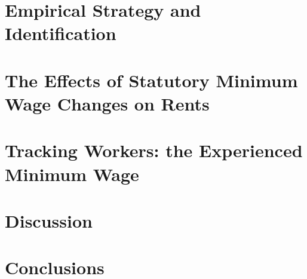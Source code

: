 \documentclass{article}
\begin{document}
\section{Empirical Strategy and Identification}\label{sec:empirical_strategy}
    

\section{The Effects of Statutory Minimum Wage Changes on Rents}\label{sec:results}
    

\section{Tracking Workers: the Experienced Minimum Wage}\label{sec:experienced_mw}
	

\section{Discussion}\label{sec:discussion}
	

\section{Conclusions}\label{sec:conclusion}
    

 


\clearpage
\printbibliography


\clearpage

\section*{}
\vspace{5mm}

\appendix

\renewcommand\thetable{\thesection.\arabic{table}}    
\renewcommand\thefigure{\thesection.\arabic{figure}} 
\setcounter{table}{0}
\setcounter{figure}{0}

\end{document}
